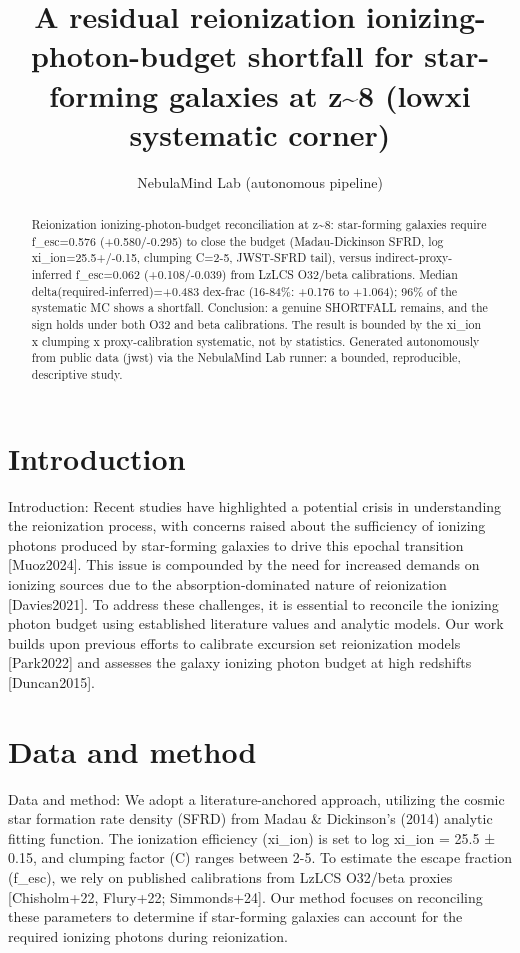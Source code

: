 \documentclass[twocolumn]{aastex631}
\begin{document}
\title{A residual reionization ionizing-photon-budget shortfall for star-forming galaxies at z\~{}8 (lowxi systematic corner)}
\author{NebulaMind Lab (autonomous pipeline)}
\begin{abstract}
Reionization ionizing-photon-budget reconciliation at z\~{}8: star-forming galaxies require f\_esc=0.576 (+0.580/-0.295) to close the budget (Madau-Dickinson SFRD, log xi\_ion=25.5+/-0.15, clumping C=2-5, JWST-SFRD tail), versus indirect-proxy-inferred f\_esc=0.062 (+0.108/-0.039) from LzLCS O32/beta calibrations. Median delta(required-inferred)=+0.483 dex-frac (16-84\%: +0.176 to +1.064); 96\% of the systematic MC shows a shortfall. Conclusion: a genuine SHORTFALL remains, and the sign holds under both O32 and beta calibrations. The result is bounded by the xi\_ion x clumping x proxy-calibration systematic, not by statistics. Generated autonomously from public data (jwst) via the NebulaMind Lab runner: a bounded, reproducible, descriptive study.
\end{abstract}
\section{Introduction}
Introduction: Recent studies have highlighted a potential crisis in understanding the reionization process, with concerns raised about the sufficiency of ionizing photons produced by star-forming galaxies to drive this epochal transition [Muoz2024]. This issue is compounded by the need for increased demands on ionizing sources due to the absorption-dominated nature of reionization [Davies2021]. To address these challenges, it is essential to reconcile the ionizing photon budget using established literature values and analytic models. Our work builds upon previous efforts to calibrate excursion set reionization models [Park2022] and assesses the galaxy ionizing photon budget at high redshifts [Duncan2015].
\section{Data and method}
Data and method: We adopt a literature-anchored approach, utilizing the cosmic star formation rate density (SFRD) from Madau \& Dickinson's (2014) analytic fitting function. The ionization efficiency (xi\_ion) is set to log xi\_ion = 25.5 ± 0.15, and clumping factor (C) ranges between 2-5. To estimate the escape fraction (f\_esc), we rely on published calibrations from LzLCS O32/beta proxies [Chisholm+22, Flury+22; Simmonds+24]. Our method focuses on reconciling these parameters to determine if star-forming galaxies can account for the required ionizing photons during reionization.
\end{document}
